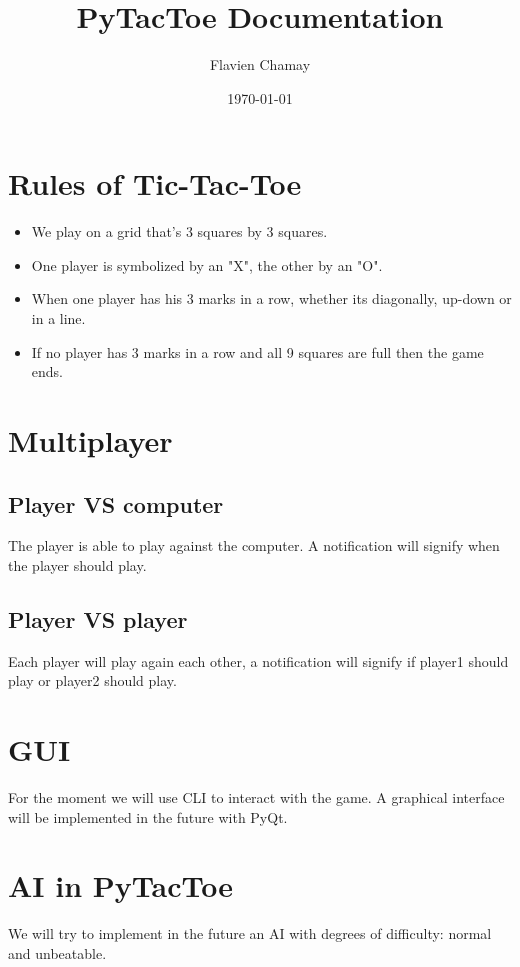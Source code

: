 \documentclass{article}
\begin{document}
\title{PyTacToe Documentation}
\author{Flavien Chamay}
\date{\today}

\maketitle

\section{Rules of Tic-Tac-Toe}
\begin{itemize}
\item We play on a grid that's 3 squares by 3 squares.
\item One player is symbolized by an "X", the other by an "O".
\item When one player has his 3 marks in a row, whether its diagonally, up-down or in a line.
\item If no player has 3 marks in a row and all 9 squares are full then the game ends.
\end{itemize}

\section{Multiplayer}
\subsection{Player VS computer}
The player is able to play against the computer. A notification will signify when the player should play.
\subsection{Player VS player}
Each player will play again each other, a notification will signify if player1 should play or player2 should play.

\section{GUI}
For the moment we will use CLI to interact with the game. A graphical interface will be implemented in the future with PyQt.

\section{AI in PyTacToe}
We will try to implement in the future an AI with degrees of difficulty: normal and unbeatable.
\end{document}
